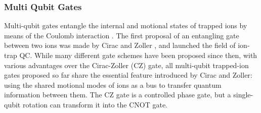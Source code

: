 \documentclass[%
12pt,
 amsmath,amssymb,
]{revtex4-2}
\begin{document}
    \subsubsection{Multi Qubit Gates}
    \label{Multiqubitgates}
Multi-qubit gates entangle the internal and motional states of trapped ions by means of the Coulomb interaction \cite{James2QGatesReview2000}.  The first proposal of an entangling gate between two ions was made by Cirac and Zoller \cite{CiracZollerGate}, and launched the field of ion-trap QC. While many different gate schemes have been proposed since then, with various advantages over the Cirac-Zoller (CZ) gate, all multi-qubit trapped-ion gates proposed so far share the essential feature introduced by Cirac and Zoller: using the shared motional modes of ions as a bus to transfer quantum information between them. The CZ gate is a controlled phase gate, but a single-qubit rotation can transform it into the CNOT gate.
\end{document}
